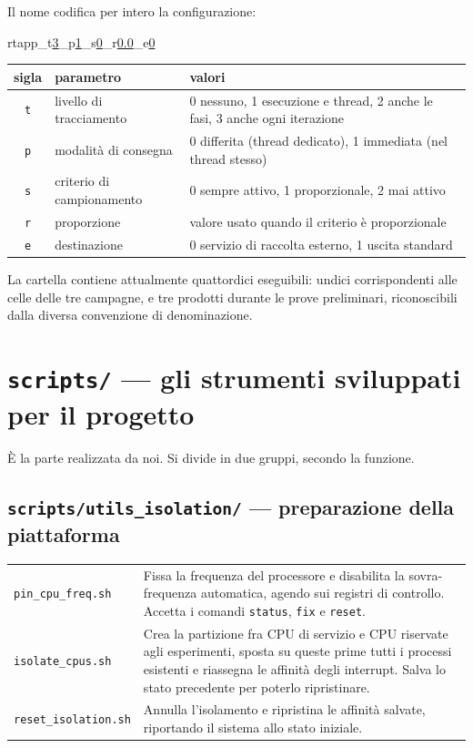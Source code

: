 Il nome codifica per intero la configurazione:

\begin{center}\ttfamily\large
rtapp\_t\underline{3}\_p\underline{1}\_s\underline{0}\_r\underline{0.0}\_e\underline{0}
\end{center}

\begin{center}\small
\begin{tabular}{clp{8.4cm}}
\toprule
\textbf{sigla} & \textbf{parametro} & \textbf{valori} \\
\midrule
\texttt{t} & livello di tracciamento & 0 nessuno, 1 esecuzione e thread, 2 anche le fasi, 3 anche ogni iterazione \\
\texttt{p} & modalit\`a di consegna & 0 differita (thread dedicato), 1 immediata (nel thread stesso) \\
\texttt{s} & criterio di campionamento & 0 sempre attivo, 1 proporzionale, 2 mai attivo \\
\texttt{r} & proporzione & valore usato quando il criterio \`e proporzionale \\
\texttt{e} & destinazione & 0 servizio di raccolta esterno, 1 uscita standard \\
\bottomrule
\end{tabular}
\end{center}

La cartella contiene attualmente quattordici eseguibili: undici corrispondenti alle celle delle tre
campagne, e tre prodotti durante le prove preliminari, riconoscibili dalla diversa convenzione di
denominazione.

\section{\texttt{scripts/} --- gli strumenti sviluppati per il progetto}

\`E la parte realizzata da noi. Si divide in due gruppi, secondo la funzione.

\subsection*{\texttt{scripts/utils\_isolation/} --- preparazione della piattaforma}

\begin{center}\small
\begin{tabular}{p{4.3cm}p{10.0cm}}
\toprule
\texttt{pin\_cpu\_freq.sh} & Fissa la frequenza del processore e disabilita la sovra-frequenza
automatica, agendo sui registri di controllo. Accetta i comandi \texttt{status}, \texttt{fix} e
\texttt{reset}. \\
\addlinespace
\texttt{isolate\_cpus.sh} & Crea la partizione fra CPU di servizio e CPU riservate agli esperimenti,
sposta su queste prime tutti i processi esistenti e riassegna le affinit\`a degli interrupt.
Salva lo stato precedente per poterlo ripristinare. \\
\addlinespace
\texttt{reset\_isolation.sh} & Annulla l'isolamento e ripristina le affinit\`a salvate,
riportando il sistema allo stato iniziale. \\
\bottomrule
\end{tabular}
\end{center}

